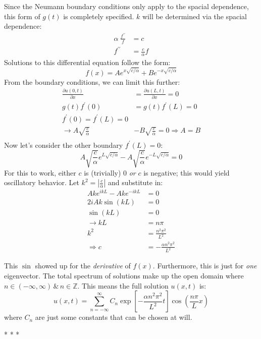 \documentclass[10pt]{article}
\newcommand{\problemterm}{\begin{center}\vspace{0.25cm}* * *\vspace{1cm}\end{center}}
\newcounter{problem}
\begin{document}
{Since the Neumann boundary conditions only apply to the spacial dependence, this form of $g(t)$ is completely specified. $k$ will be determined via the spacial dependence:
\begin{align*}
  \alpha\ \frac{f^{\prime \prime}}{f} &= c \\
  f^{\prime \prime} &= \frac{c}{\alpha}f
\end{align*}
Solutions to this differential equation follow the form: \[f(x) = Ae^{x\sqrt{c/\alpha}} + Be^{-x\sqrt{c/\alpha}}\] From the boundary conditions, we can limit this further:
\begin{align*}
  \frac{\partial u(0, t)}{\partial x} &= \frac{\partial u(L, t)}{\partial x} = 0 \\
  g(t)f^{\prime}(0) &= g(t)f^{\prime}(L) = 0 \\
  f^{\prime}(0) = f^{\prime}(L) = 0 \\
  \rightarrow A\sqrt{\frac{c}{\alpha}} &- B\sqrt{\frac{c}{\alpha}} = 0 \Rightarrow A = B \\
\end{align*}
Now let's consider the other boundary $f^{\prime}(L) = 0$:
\[A\sqrt{\frac{c}{\alpha}}e^{L\sqrt{c/\alpha}} - A\sqrt{\frac{c}{\alpha}}e^{-L\sqrt{c/\alpha}}= 0\]
For this to work, either $c$ is (trivially) 0 \textit{or} $c$ is negative; this would yield oscillatory behavior. Let $k^2 = \left|\frac{c}{\alpha}\right|$ and substitute in:
\begin{align*}
  Ak e^{i kL} - Ak e^{-i kL} &= 0 \\
  2i Ak\sin(kL) &= 0 \\
  \sin(kL) &= 0 \\
  \rightarrow kL &= n\pi \\
  k^2 &= \frac{n^2 \pi^2}{L^2} \\
  \Rightarrow c &= -\frac{\alpha n^2 \pi^2}{L^2}
\end{align*}

This $\sin$ showed up for the \textit{derivative} of $f(x)$. Furthermore, this is just for \textit{one} eigenvector. The total spectrum of solutions make up the open domain where $n\in(-\infty, \infty)\,\&\,n\in\mathbb{Z}$. This means the full solution $u(x,t)$ is:
\begin{equation}
  u(x, t) = \sum_{n=-\infty}^{\infty}C_n\exp\left[-\frac{\alpha n^2 \pi^2}{L^2} t\right]\cos\left(\frac{n\pi}{L}x\right)
\end{equation}
where  $C_n$ are just some constants that can be chosen at will.

\problemterm

}
\end{document}
